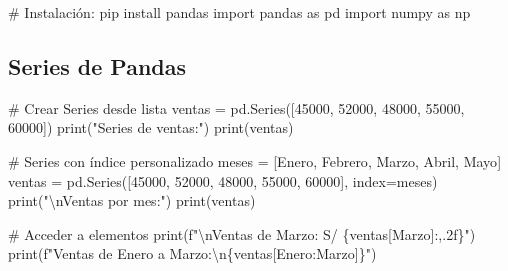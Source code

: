 \documentclass[
  doc,
  floatsintext,
  longtable,
  a4paper,
  nolmodern,
  notxfonts,
  notimes,
  12pt,
  colorlinks=true,linkcolor=blue,citecolor=blue,urlcolor=blue]{apa7}
\newenvironment{Shaded}{\begin{snugshade}}{\end{snugshade}}
\newcommand{\BuiltInTok}[1]{\textcolor[rgb]{0.00,0.23,0.31}{#1}}
\newcommand{\CharTok}[1]{\textcolor[rgb]{0.13,0.47,0.30}{#1}}
\newcommand{\CommentTok}[1]{\textcolor[rgb]{0.37,0.37,0.37}{#1}}
\newcommand{\DecValTok}[1]{\textcolor[rgb]{0.68,0.00,0.00}{#1}}
\newcommand{\ImportTok}[1]{\textcolor[rgb]{0.00,0.46,0.62}{#1}}
\newcommand{\NormalTok}[1]{\textcolor[rgb]{0.00,0.23,0.31}{#1}}
\newcommand{\OperatorTok}[1]{\textcolor[rgb]{0.37,0.37,0.37}{#1}}
\newcommand{\SpecialCharTok}[1]{\textcolor[rgb]{0.37,0.37,0.37}{#1}}
\newcommand{\SpecialStringTok}[1]{\textcolor[rgb]{0.13,0.47,0.30}{#1}}
\newcommand{\StringTok}[1]{\textcolor[rgb]{0.13,0.47,0.30}{#1}}
\begin{document}
\begin{Shaded}
\begin{Highlighting}[]
\CommentTok{\# Instalación: pip install pandas}
\ImportTok{import}\NormalTok{ pandas }\ImportTok{as}\NormalTok{ pd}
\ImportTok{import}\NormalTok{ numpy }\ImportTok{as}\NormalTok{ np}
\end{Highlighting}
\end{Shaded}

\subsection{Series de Pandas}\label{series-de-pandas}

\begin{Shaded}
\begin{Highlighting}[]
\CommentTok{\# Crear Series desde lista}
\NormalTok{ventas }\OperatorTok{=}\NormalTok{ pd.Series([}\DecValTok{45000}\NormalTok{, }\DecValTok{52000}\NormalTok{, }\DecValTok{48000}\NormalTok{, }\DecValTok{55000}\NormalTok{, }\DecValTok{60000}\NormalTok{])}
\BuiltInTok{print}\NormalTok{(}\StringTok{"Series de ventas:"}\NormalTok{)}
\BuiltInTok{print}\NormalTok{(ventas)}

\CommentTok{\# Series con índice personalizado}
\NormalTok{meses }\OperatorTok{=}\NormalTok{ [}\StringTok{\textquotesingle{}Enero\textquotesingle{}}\NormalTok{, }\StringTok{\textquotesingle{}Febrero\textquotesingle{}}\NormalTok{, }\StringTok{\textquotesingle{}Marzo\textquotesingle{}}\NormalTok{, }\StringTok{\textquotesingle{}Abril\textquotesingle{}}\NormalTok{, }\StringTok{\textquotesingle{}Mayo\textquotesingle{}}\NormalTok{]}
\NormalTok{ventas }\OperatorTok{=}\NormalTok{ pd.Series([}\DecValTok{45000}\NormalTok{, }\DecValTok{52000}\NormalTok{, }\DecValTok{48000}\NormalTok{, }\DecValTok{55000}\NormalTok{, }\DecValTok{60000}\NormalTok{], index}\OperatorTok{=}\NormalTok{meses)}
\BuiltInTok{print}\NormalTok{(}\StringTok{"}\CharTok{\textbackslash{}n}\StringTok{Ventas por mes:"}\NormalTok{)}
\BuiltInTok{print}\NormalTok{(ventas)}

\CommentTok{\# Acceder a elementos}
\BuiltInTok{print}\NormalTok{(}\SpecialStringTok{f"}\CharTok{\textbackslash{}n}\SpecialStringTok{Ventas de Marzo: S/ }\SpecialCharTok{\{}\NormalTok{ventas[}\StringTok{\textquotesingle{}Marzo\textquotesingle{}}\NormalTok{]}\SpecialCharTok{:,.2f\}}\SpecialStringTok{"}\NormalTok{)}
\BuiltInTok{print}\NormalTok{(}\SpecialStringTok{f"Ventas de Enero a Marzo:}\CharTok{\textbackslash{}n}\SpecialCharTok{\{}\NormalTok{ventas[}\StringTok{\textquotesingle{}Enero\textquotesingle{}}\NormalTok{:}\StringTok{\textquotesingle{}Marzo\textquotesingle{}}\NormalTok{]}\SpecialCharTok{\}}\SpecialStringTok{"}\NormalTok{)}


\end{Highlighting}
\end{Shaded}
\end{document}
